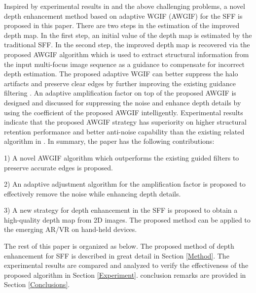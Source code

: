 \documentclass[a4paper,fleqn]{cas-dc}
\begin{document}
Inspired by experimental results in \cite{ali2021guided} and the above challenging problems, a novel depth enhancement method based on adaptive WGIF (AWGIF) for the SFF is proposed in this paper. There are two steps in the estimation of the improved depth map. In the first step, an initial value of the depth map is estimated by the traditional SFF. In the second step, the improved depth map is recovered via the proposed AWGIF algorithm which is used to extract structural information from the input multi-focus image sequence as a guidance to compensate for incorrect depth estimation. The proposed adaptive WGIF can better suppress the halo artifacts and preserve clear edges by further improving the existing guidance filtering \cite{he2013guided,li2015weighted,chen2020weighted}. An adaptive amplification factor on top of the proposed AWGIF is designed and discussed for suppressing the noise and enhance depth details by using the coefficient of the proposed AWGIF intelligently. Experimental results indicate that the proposed AWGIF strategy has superiority on higher structural retention performance and better anti-noise capability than the existing related algorithm in \cite{he2013guided,li2015weighted,chen2020weighted,lu2018effictive}. In summary, the paper has the following contributions:

1) A novel AWGIF algorithm which outperforms the existing guided filters \cite{he2013guided,li2015weighted,chen2020weighted,lu2018effictive} to preserve accurate edges is proposed.

2) An adaptive adjustment algorithm for the amplification factor is proposed to effectively remove the noise while enhancing depth details.

3) A new strategy for depth enhancement in the SFF is proposed to obtain a high-quality depth map from 2D images. The proposed method can be applied to the emerging AR/VR on hand-held devices. 

The rest of this paper is organized as below. The proposed method of depth enhancement for SFF is described in great detail in Section \ref{Method}. The experimental results are compared and analyzed to verify the effectiveness of the proposed algorithm in Section \ref{Experiment}. conclusion remarks are provided in Section \ref{Conclusions}.
\end{document}
